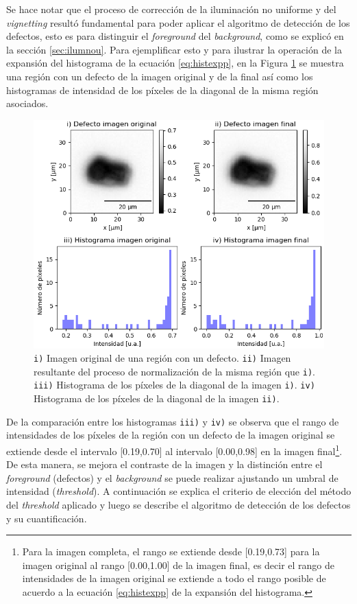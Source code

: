 Se hace notar que el proceso de corrección de la iluminación no uniforme y del \textit{vignetting} resultó fundamental para poder aplicar el algoritmo de detección de los defectos, esto es para distinguir el \textit{foreground} del \textit{background}, como se explicó en la sección \ref{sec:ilumnou}. Para ejemplificar esto y para ilustrar la operación de la expansión del histograma de la ecuación \ref{eq:histexpp}, en la Figura \ref{fig:defecthi} se muestra una región con un defecto de la imagen original y de la final así como los histogramas de intensidad de los píxeles de la diagonal de la misma región asociados.


\begin{figure}[H]
	\centering
	\includegraphics[scale=1.0]{Figs/defectosZEISS/correccionilum/defectoehist.png}
	\caption{\texttt{i)} Imagen original de una región con un defecto. \texttt{ii)} Imagen resultante del proceso de normalización de la misma región que \texttt{i)}. \texttt{iii)} Histograma de los píxeles de la diagonal de la imagen \texttt{i)}. \texttt{iv)} Histograma de los píxeles de la diagonal de la imagen \texttt{ii)}.}
	\label{fig:defecthi}
\end{figure}

De la comparación entre los histogramas \texttt{iii)} y \texttt{iv)} se observa que el rango de intensidades de los píxeles de la región con un defecto de la imagen original se extiende desde el intervalo [0.19,0.70] al intervalo [0.00,0.98] en la imagen final\footnote{Para la imagen completa, el rango se extiende desde [0.19,0.73] para la imagen original al rango [0.00,1.00] de la imagen final, es decir el rango de intensidades de la imagen original se extiende a todo el rango posible de acuerdo a la ecuación \ref{eq:histexpp} de la expansión del histograma.}. De esta manera, se mejora el contraste de la imagen y la distinción entre el \textit{foreground} (defectos) y el \textit{background} se puede realizar ajustando un umbral de intensidad  (\textit{threshold}). A continuación se explica el criterio de elección del método del \textit{threshold} aplicado y luego se describe el algoritmo de detección de los defectos y su cuantificación.

